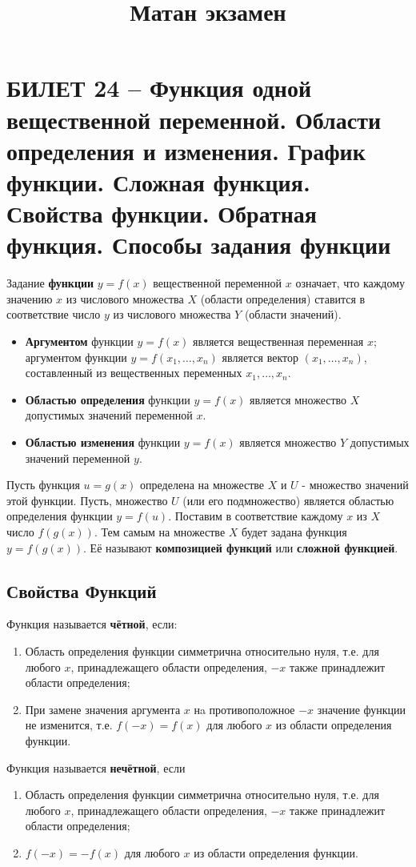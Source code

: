 \documentclass{article}
\title{Матан экзамен}
\begin{document}
\maketitle 
\tableofcontents
\newpage
\section{БИЛЕТ 24 --  Функция одной вещественной переменной. Области определения и изменения. График функции. Сложная функция. Свойства функции. Обратная функция. Способы задания функции}

Задание \textbf{функции}  $y = f (x)$  вещественной переменной  $x$  означает, что каждому значению  $x$  из числового множества $X$ (области определения) ставится в соответствие число $y$ из числового множества $Y$ (области значений).
\begin{itemize}
    \item \textbf{Аргументом} функции  $y = f (x)$  является вещественная переменная  $x$; аргументом функции  $y = f (x_1, \ldots, x_n)$  является вектор $(x_1, \ldots, x_n)$, составленный из вещественных переменных  $x_1, \ldots, x_n$.
    \item \textbf{Областью определения} функции  $y = f (x)$  является множество  $X$  допустимых значений переменной  $x$. 
    \item \textbf{Областью изменения} функции  $y = f (x)$  является множество  $Y$  допустимых значений переменной  $y$.
\end{itemize}
Пусть функция $u=g(x)$  определена на множестве $X$ и $U$ - множество значений этой функции. Пусть, множество $U$ (или его подмножество) является областью определения функции $y=f(u)$. Поставим  в соответствие каждому $x$ из $X$ число $f(g(x))$. Тем самым на множестве $X$ будет задана функция $y=f(g(x))$. Её называют \textbf{композицией функций} или \textbf{сложной функцией}.
\subsection{Свойства Функций}
Функция называется \textbf{чётной}, если:
\begin{enumerate}
    \item Область определения функции симметрична относительно нуля, т.е. для любого $x$, принадлежащего области определения, $-x$ также принадлежит области определения; 
    \item При замене значения аргумента $x$ нa противоположное $-x$ значение функции не изменится, т.е. $f(-x)=f(x)$ для любого $x$ из области определения функции.
\end{enumerate}
Функция называется \textbf{нечётной}, если
\begin{enumerate}
    \item Область определения функции симметрична относительно нуля, т.е. для любого $x$, принадлежащего области определения, $-x$ также принадлежит области определения; 
    \item $f(-x)=-f(x)$ для любого $x$ из области определения функции.
\end{enumerate}
\end{document}
